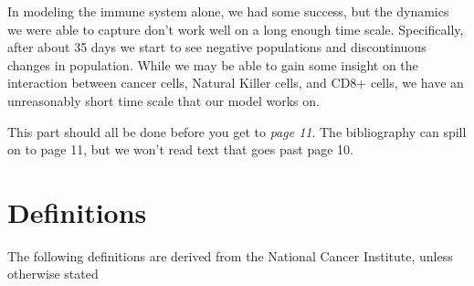 \documentclass[11pt]{amsart}
\begin{document}
In modeling the immune system alone, we had some success, but the dynamics we were able to capture don't work well on a long enough time scale. Specifically, after about 35 days we start to see negative populations and discontinuous changes in population. While we may be able to gain some insight on the interaction between cancer cells, Natural Killer cells, and CD8+ cells, we have an unreasonably short time scale that our model works on. 

This part should all be done before you get to \emph{page 11}.  The bibliography can spill on to page 11, but we won't read text that goes past page 10.

\appendix
\section{Definitions}
\label{appendix: defs}
The following definitions are derived from the National Cancer Institute, unless otherwise stated
\end{document}
